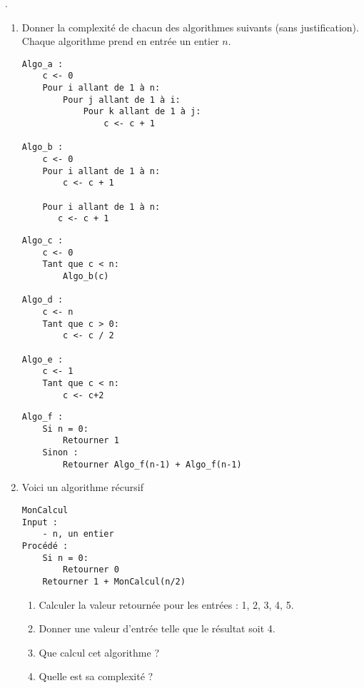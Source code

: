 
\begin{exercice}.

\begin{enumerate}

\item Donner la complexité de chacun des algorithmes suivants (sans justification). Chaque algorithme 
prend en entrée un entier $n$. 

\begin{minipage}[t]{0.48 \textwidth}
\begin{lstlisting}
Algo_a :
    c <- 0
    Pour i allant de 1 à n:
        Pour j allant de 1 à i:
            Pour k allant de 1 à j:
                c <- c + 1
            
Algo_b :
    c <- 0
    Pour i allant de 1 à n:
        c <- c + 1
        
    Pour i allant de 1 à n:
       c <- c + 1     
\end{lstlisting}
\end{minipage}
\begin{minipage}[t]{0.48 \textwidth}
\begin{lstlisting}
Algo_c :
    c <- 0
    Tant que c < n:
        Algo_b(c)

Algo_d :
    c <- n
    Tant que c > 0:
        c <- c / 2 

Algo_e :
    c <- 1
    Tant que c < n:
        c <- c+2
\end{lstlisting}
\end{minipage}

\begin{lstlisting}
Algo_f :
    Si n = 0:
        Retourner 1
    Sinon :
        Retourner Algo_f(n-1) + Algo_f(n-1)
\end{lstlisting}

\item

Voici un algorithme récursif

\begin{lstlisting}
MonCalcul
Input :
    - n, un entier
Procédé :
    Si n = 0:
        Retourner 0
    Retourner 1 + MonCalcul(n/2)
\end{lstlisting}

\begin{enumerate}
\item Calculer la valeur retournée pour les entrées : 1, 2, 3, 4, 5.
\item Donner une valeur d'entrée telle que le résultat soit 4.
\item Que calcul cet algorithme ?
\item Quelle est sa complexité ?
\end{enumerate}


\end{enumerate}

\end{exercice}
